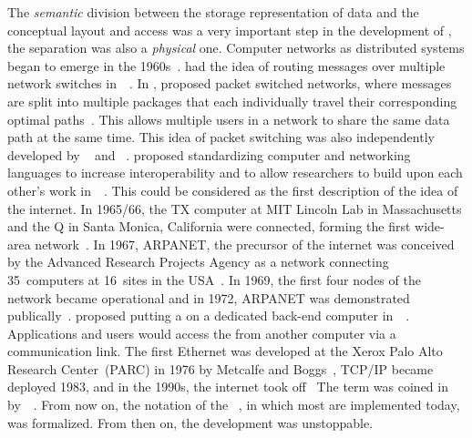 The \emph{semantic} division between the storage representation of data and the conceptual layout and access was a very important step in the development of , the separation was also a \emph{physical} one.
Computer networks as distributed systems began to emerge in the 1960s~\cite{KR2020CNATDA}.
 had the idea of routing messages over multiple network switches in~\citeyear{B1960OADCACSC}~\cite{B1964ODCIITDCN,B1964ODCVHAAAC,B1965ABOTDAMBN,B1960OADCACSC,B1962ODCN}.
In \citeyear{K1961IFILCNPTP}, \citeauthor{K1961IFILCNPTP} proposed packet switched networks, where messages are split into multiple packages that each individually travel their corresponding optimal paths~\cite{K1961IFILCNPTP}.
This allows multiple users in a network to share the same data path at the same time.
This idea of packet switching was also independently developed by \citeauthor{B1962ODCN}~\cite{B1962ODCN} and \citeauthor{D1965ROLDPAICN}~\cite{D1965ROLDPAICN,D1965PFTDOANCSFOLDP,D1966PFADCN}.
 proposed standardizing computer and networking languages to increase interoperability and to allow researchers to build upon each other's work in~\citeyear{L1963MFMAAOTICN}~\cite{L1963MFMAAOTICN}.
This could be considered as the first description of the idea of the internet.
In 1965/66, the TX computer at MIT Lincoln Lab in Massachusetts and the Q in Santa Monica, California were connected, forming the first wide-area network~\cite{L1986TAACN}.
In 1967, ARPANET, the precursor of the internet was conceived by the Advanced Research Projects Agency as a network connecting 35~computers at 16~sites in the USA~\cite{L1986TAACN,KR2020CNATDA}.
In 1969, the first four nodes of the network became operational and in 1972, ARPANET was demonstrated publically~\cite{L1986TAACN,KR2020CNATDA}.
 proposed putting a  on a dedicated back-end computer in~\citeyear{CHIRW1974ABECFDBM}~\cite{CHIRW1974ABECFDBM}.
Applications and users would access the  from another computer via a communication link.
The first Ethernet was developed at the Xerox Palo Alto Research Center~(PARC) in 1976 by Metcalfe and Boggs~\cite{CHM1996CLN}, TCP/IP became deployed 1983, and in the 1990s, the internet took off~\cite{KR2020CNATDA}
The term  was coined in \citeyear{IMS1978SDFFIADFS} by~\citeauthor{IMS1978SDFFIADFS}~\cite{IMS1978SDFFIADFS}.
From now on, the notation of the ~\cite{RCKS2019PNP,B1996CSA,OHE1999CSSG,RF2020FOSAAEA,EOEBLGGCH2025CSA}, in which most  are implemented today, was formalized.
From then on, the development was unstoppable.

